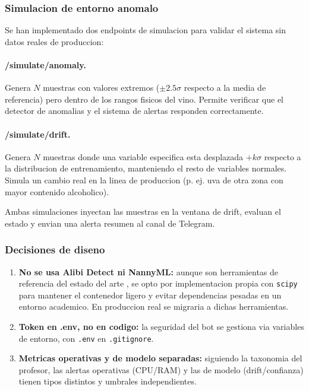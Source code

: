 \subsubsection{Simulacion de entorno anomalo}

Se han implementado dos endpoints de simulacion para validar el sistema sin datos reales de produccion:

\paragraph{/simulate/anomaly.} Genera $N$ muestras con valores extremos ($\pm 2.5\sigma$ respecto a la media de referencia) pero dentro de los rangos fisicos del vino. Permite verificar que el detector de anomalias y el sistema de alertas responden correctamente.

\paragraph{/simulate/drift.} Genera $N$ muestras donde una variable especifica esta desplazada $+k\sigma$ respecto a la distribucion de entrenamiento, manteniendo el resto de variables normales. Simula un cambio real en la linea de produccion (p. ej. uva de otra zona con mayor contenido alcoholico).

Ambas simulaciones inyectan las muestras en la ventana de drift, evaluan el estado y envian una alerta resumen al canal de Telegram.

\subsubsection{Decisiones de diseno}

\begin{enumerate}
    \item \textbf{No se usa Alibi Detect ni NannyML:} aunque son herramientas de referencia del estado del arte \cite{alibi_detect, nannyml}, se opto por implementacion propia con \texttt{scipy} para mantener el contenedor ligero y evitar dependencias pesadas en un entorno academico. En produccion real se migraria a dichas herramientas.
    \item \textbf{Token en .env, no en codigo:} la seguridad del bot se gestiona via variables de entorno, con \texttt{.env} en \texttt{.gitignore}.
    \item \textbf{Metricas operativas y de modelo separadas:} siguiendo la taxonomia del profesor, las alertas operativas (CPU/RAM) y las de modelo (drift/confianza) tienen tipos distintos y umbrales independientes.
\end{enumerate}
